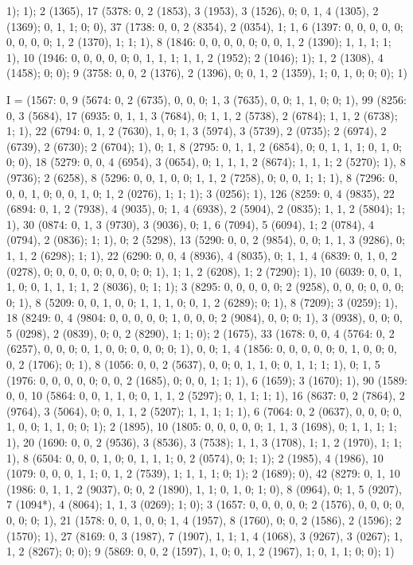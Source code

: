 {1); 1); 2 (1365), 17 (5378: 0, 2 (1853), 3 (1953), 3 (1526), 0; 0, 1, 4 (1305), 2 (1369); 0, 1, 1; 0; 0), 37 (1738: 0, 0, 2 (8354), 2 (0354), 1; 1, 6 (1397: 0, 0, 0, 0, 0; 0, 0, 0, 0; 1, 2 (1370), 1; 1; 1), 8 (1846: 0, 0, 0, 0, 0; 0, 0, 1, 2 (1390); 1, 1, 1; 1; 1), 10 (1946: 0, 0, 0, 0, 0; 0, 1, 1, 1; 1, 1, 2 (1952); 2 (1046); 1); 1, 2 (1308), 4 (1458); 0; 0); 9 (3758: 0, 0, 2 (1376), 2 (1396), 0; 0, 1, 2 (1359), 1; 0, 1, 0; 0; 0); 1)

I = (1567: 0, 9 (5674: 0, 2 (6735), 0, 0, 0; 1, 3 (7635), 0, 0; 1, 1, 0; 0; 1), 99 (8256: 0, 3 (5684), 17 (6935: 0, 1, 1, 3 (7684), 0; 1, 1, 2 (5738), 2 (6784); 1, 1, 2 (6738); 1; 1), 22 (6794: 0, 1, 2 (7630), 1, 0; 1, 3 (5974), 3 (5739), 2 (0735); 2 (6974), 2 (6739), 2 (6730); 2 (6704); 1), 0; 1, 8 (2795: 0, 1, 1, 2 (6854), 0; 0, 1, 1, 1; 0, 1, 0; 0; 0), 18 (5279: 0, 0, 4 (6954), 3 (0654), 0; 1, 1, 1, 2 (8674); 1, 1, 1; 2 (5270); 1), 8 (9736); 2 (6258), 8 (5296: 0, 0, 1, 0, 0; 1, 1, 2 (7258), 0; 0, 0, 1; 1; 1), 8 (7296: 0, 0, 0, 1, 0; 0, 0, 1, 0; 1, 2 (0276), 1; 1; 1); 3 (0256); 1), 126 (8259: 0, 4 (9835), 22 (6894: 0, 1, 2 (7938), 4 (9035), 0; 1, 4 (6938), 2 (5904), 2 (0835); 1, 1, 2 (5804); 1; 1), 30 (0874: 0, 1, 3 (9730), 3 (9036), 0; 1, 6 (7094), 5 (6094), 1; 2 (0784), 4 (0794), 2 (0836); 1; 1), 0; 2 (5298), 13 (5290: 0, 0, 2 (9854), 0, 0; 1, 1, 3 (9286), 0; 1, 1, 2 (6298); 1; 1), 22 (6290: 0, 0, 4 (8936), 4 (8035), 0; 1, 1, 4 (6839: 0, 1, 0, 2 (0278), 0; 0, 0, 0, 0; 0, 0, 0; 0; 1), 1; 1, 2 (6208), 1; 2 (7290); 1), 10 (6039: 0, 0, 1, 1, 0; 0, 1, 1, 1; 1, 2 (8036), 0; 1; 1); 3 (8295: 0, 0, 0, 0, 0; 2 (9258), 0, 0, 0; 0, 0, 0; 0; 1), 8 (5209: 0, 0, 1, 0, 0; 1, 1, 1, 0; 0, 1, 2 (6289); 0; 1), 8 (7209); 3 (0259); 1), 18 (8249: 0, 4 (9804: 0, 0, 0, 0, 0; 1, 0, 0, 0; 2 (9084), 0, 0; 0; 1), 3 (0938), 0, 0; 0, 5 (0298), 2 (0839), 0; 0, 2 (8290), 1; 1; 0); 2 (1675), 33 (1678: 0, 0, 4 (5764: 0, 2 (6257), 0, 0, 0; 0, 1, 0, 0; 0, 0, 0; 0; 1), 0, 0; 1, 4 (1856: 0, 0, 0, 0, 0; 0, 1, 0, 0; 0, 0, 2 (1706); 0; 1), 8 (1056: 0, 0, 2 (5637), 0, 0; 0, 1, 1, 0; 0, 1, 1; 1; 1), 0; 1, 5 (1976: 0, 0, 0, 0, 0; 0, 0, 2 (1685), 0; 0, 0, 1; 1; 1), 6 (1659); 3 (1670); 1), 90 (1589: 0, 0, 10 (5864: 0, 0, 1, 1, 0; 0, 1, 1, 2 (5297); 0, 1, 1; 1; 1), 16 (8637: 0, 2 (7864), 2 (9764), 3 (5064), 0; 0, 1, 1, 2 (5207); 1, 1, 1; 1; 1), 6 (7064: 0, 2 (0637), 0, 0, 0; 0, 1, 0, 0; 1, 1, 0; 0; 1); 2 (1895), 10 (1805: 0, 0, 0, 0, 0; 1, 1, 3 (1698), 0; 1, 1, 1; 1; 1), 20 (1690: 0, 0, 2 (9536), 3 (8536), 3 (7538); 1, 1, 3 (1708), 1; 1, 2 (1970), 1; 1; 1), 8 (6504: 0, 0, 0, 1, 0; 0, 1, 1, 1; 0, 2 (0574), 0; 1; 1); 2 (1985), 4 (1986), 10 (1079: 0, 0, 0, 1, 1; 0, 1, 2 (7539), 1; 1, 1, 1; 0; 1); 2 (1689); 0), 42 (8279: 0, 1, 10 (1986: 0, 1, 1, 2 (9037), 0; 0, 2 (1890), 1, 1; 0, 1, 0; 1; 0), 8 (0964), 0; 1, 5 (9207), 7 (1094*), 4 (8064); 1, 1, 3 (0269); 1; 0); 3 (1657: 0, 0, 0, 0, 0; 2 (1576), 0, 0, 0; 0, 0, 0; 0; 1), 21 (1578: 0, 0, 1, 0, 0; 1, 4 (1957), 8 (1760), 0; 0, 2 (1586), 2 (1596); 2 (1570); 1), 27 (8169: 0, 3 (1987), 7 (1907), 1, 1; 1, 4 (1068), 3 (9267), 3 (0267); 1, 1, 2 (8267); 0; 0); 9 (5869: 0, 0, 2 (1597), 1, 0; 0, 1, 2 (1967), 1; 0, 1, 1; 0; 0); 1)

}
